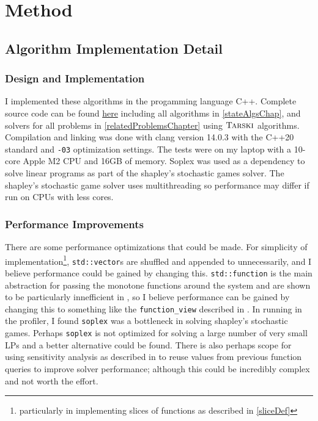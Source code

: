 \section{Method}
\subsection{Algorithm Implementation Detail}
\subsubsection{Design and Implementation}
I implemented these algorithms in the progamming language C++.
Complete source code can be found \href{https://github.com/angusjoshi/tarski}{here}
including all algorithms in \cref{stateAlgsChap},
and solvers for all problems in \cref{relatedProblemsChapter} using $\textsc{Tarski}$ algorithms.
Compilation and linking was done with
clang version 14.0.3 with the C++20 standard and \lstinline{-03} optimization settings.
The tests were on my laptop with a 10-core Apple M2 CPU and 16GB of memory.
Soplex\citep{soplex} was used as a dependency to solve linear programs
as part of the shapley's stochastic games solver.
The shapley's stochastic game solver uses multithreading so performance may differ
if run on CPUs with less cores.\\
\subsubsection{Performance Improvements}
There are some performance optimizations that could be made. For simplicity of implementation\footnote{particularly
in implementing slices of functions as described in \cref{sliceDef}},
\lstinline{std::vector}s are shuffled and appended to unnecessarily, and I believe
performance could be gained by changing this. \lstinline{std::function} is the main abstraction for passing
the monotone functions around the system and are shown to be particularly innefficient in \citep{stdFunctionBad},
so I believe performance can be gained by changing this to something like the \lstinline{function_view}
described in \citep{stdFunctionBad}.
In running in the profiler, I found \lstinline{soplex} was a bottleneck in solving shapley's stochastic games.
Perhaps \lstinline{soplex} is not optimized for solving a large number of very small LPs and a better alternative could be found.
There is also perhaps scope for using sensitivity
analysis as described in \citep{sensAnalysis} to reuse values from previous function queries to improve
solver performance; although this could be incredibly complex and not worth the effort.

